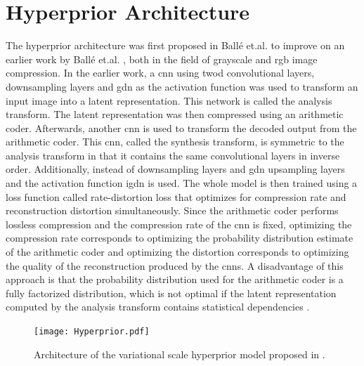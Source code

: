 \section{Hyperprior Architecture}
The hyperprior architecture was first proposed in Ballé et.al. \citep{balle_variational_2018} to improve on an earlier work by Ballé et.al. \citep{balle_end--end_2017}, both in the field of grayscale and \ac{rgb} image compression. In the earlier work, a \ac{cnn} using \ac{twod} convolutional layers, downsampling layers and \ac{gdn} as the activation function was used to transform an input image into a latent representation. This network is called the analysis transform. The latent representation was then compressed using an arithmetic coder. Afterwards, another \ac{cnn} is used to transform the decoded output from the arithmetic coder. This \ac{cnn}, called the synthesis transform, is symmetric to the analysis transform in that it contains the same convolutional layers in inverse order. Additionally, instead of downsampling layers and \ac{gdn} upsampling layers and the activation function \ac{igdn} is used. The whole model is then trained using a loss function called rate-distortion loss that optimizes for compression rate and reconstruction distortion simultaneously. Since the arithmetic coder performs lossless compression and the compression rate of the \ac{cnn} is fixed, optimizing the compression rate corresponds to optimizing the probability distribution estimate of the arithmetic coder and optimizing the distortion corresponds to optimizing the quality of the reconstruction produced by the \acp{cnn}. A disadvantage of this approach is that the probability distribution used for the arithmetic coder is a fully factorized distribution, which is not optimal if the latent representation computed by the analysis transform contains statistical dependencies \citep{balle_variational_2018}.

\begin{figure}
\centering
\texttt{[image: Hyperprior.pdf]}
\caption[Scale hyperprior architecture]{Architecture of the variational scale hyperprior model proposed in \citep{balle_variational_2018}.}
\label{fig:hyperprior}
\end{figure}

